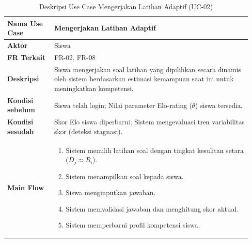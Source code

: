 \begin{table}[H]
    \centering
    \caption{Deskripsi Use Case Mengerjakan Latihan Adaptif (UC-02)}
    \label{tbl:desc_uc02}
    \begin{tabular}{|p{}|p{}|}
        \hline
        \textbf{Nama Use Case} & \textbf{Mengerjakan Latihan Adaptif} \\
        \hline
        \textbf{Aktor} & Siswa \\
        \hline
        \textbf{FR Terkait} & FR-02, FR-08 \\
        \hline
        \textbf{Deskripsi} & Siswa mengerjakan soal latihan yang dipilihkan secara dinamis oleh sistem berdasarkan estimasi kemampuan saat ini untuk meningkatkan kompetensi. \\
        \hline
        \textbf{Kondisi sebelum} & Siswa telah login; Nilai parameter Elo-rating ($\theta$) siswa tersedia. \\
        \hline
        \textbf{Kondisi sesudah} & Skor Elo siswa diperbarui; Sistem mengevaluasi tren variabilitas skor (deteksi stagnasi). \\
        \hline
        \textbf{Main Flow} & \begin{enumerate}[noitemsep,topsep=0pt,leftmargin=*]
            \item Sistem memilih latihan soal dengan tingkat kesulitan setara ($D_j \approx R_i$).
            \item Sistem menampilkan soal kepada siswa.
            \item Siswa menginputkan jawaban.
            \item Sistem memvalidasi jawaban dan menghitung skor aktual.
            \item Sistem memperbarui profil kompetensi siswa.
        \end{enumerate} \\
        \hline
    \end{tabular}
\end{table}
